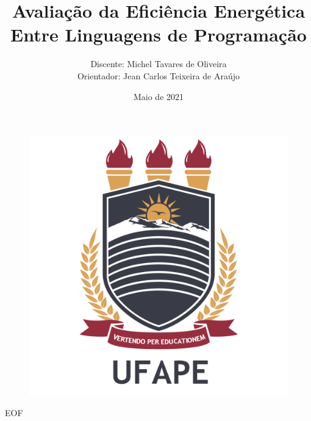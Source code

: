 \documentclass[aspectratio=169]{beamer}
\author{Discente: Michel Tavares de Oliveira  \\ Orientador: Jean Carlos Teixeira de Araújo}
\title[Avaliação da Eficiência Energética Entre Linguagens de Programação]{Avaliação da Eficiência Energética Entre Linguagens de Programação}
\institute{Universidade Federal do Agreste de Pernambuco}
\date{Maio de 2021}
\begin{document}
\begin{frame}
    \titlepage
    \vspace{-10pt}
    \begin{figure}[htpb]
        \begin{center}
            \includegraphics[width=0.13\linewidth]{images/ufapelogo.png}
        \end{center}
    \end{figure}
\end{frame}

\begin{frame}
    \tableofcontents[sectionstyle=show,subsectionstyle=show/shaded/hide,subsubsectionstyle=show/shaded/hide]
\end{frame}






\begin{frame}[allowframebreaks]
    \printbibliography
\end{frame}

\begin{frame}
    \begin{center}
        {\Huge EOF}
    \end{center}
\end{frame}
\end{document}
